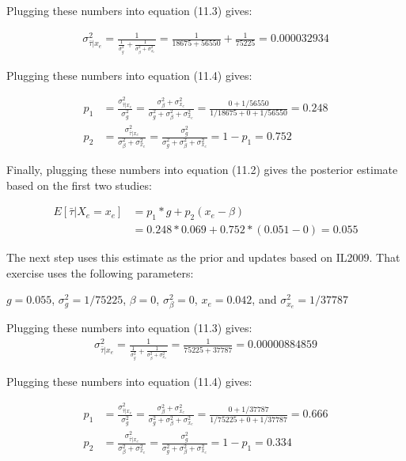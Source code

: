\documentclass[11pt,notitlepage]{article}\usepackage[]{graphicx}\usepackage[]{color}
\begin{document}
\begin{enumerate}[a)]
Plugging these numbers into equation (11.3) gives: 

 \begin{align*}
\sigma^2_{\bar{\tau}|x_e} = \frac{1}{\frac{1}{\sigma^2_g} + \frac{1}{\sigma^2_{\beta} + \sigma^2_{x_e}}} = \frac{1}{18675+56550 }+ \frac{1}{75225} = 0.000032934
\end{align*}
 
Plugging these numbers into equation (11.4) gives: 

\begin{align*}
p_1 &= \frac{\sigma^2_{\bar{\tau}|x_e}}{\sigma^2_g} = \frac{\sigma^2_{\beta} + \sigma^2_{x_e}}{\sigma^2_g +\sigma^2_{\beta} + \sigma^2_{x_e}} = \frac{0+1/56550}{1/18675+0+1/56550} = 0.248\\
p_2 &= \frac{\sigma^2_{\bar{\tau}|x_e}}{\sigma^2_{\beta} + \sigma^2_{x_e}} = \frac{\sigma^2_g}{\sigma^2_g +\sigma^2_{\beta} + \sigma^2_{x_e}} = 1 - p_1 = 0.752
\end{align*}

Finally, plugging these numbers into equation (11.2) gives the posterior estimate based on the first two studies:

\begin{align*}
E[\bar{\tau}|X_e = x_e] &= p_1*g + p_2(x_e - \beta) \\
&= 0.248 * 0.069 +0.752 * (0.051-0) = 0.055
\end{align*}


The next step uses this estimate as the prior and updates based on IL2009.  That exercise uses the following parameters: 

$g=0.055$, $\sigma^2_g = 1/75225$, $\beta = 0$, $\sigma^2_{\beta} = 0$, $x_e = 0.042$, and $\sigma^2_{x_e} = 1/37787$

Plugging these numbers into equation (11.3) gives: 
 \begin{align*}
\sigma^2_{\bar{\tau}|x_e} = \frac{1}{\frac{1}{\sigma^2_g} + \frac{1}{\sigma^2_{\beta} + \sigma^2_{x_e}}} = \frac{1}{75225+37787 }= 0.00000884859
\end{align*}

Plugging these numbers into equation (11.4) gives: 
 
 \begin{align*}
p_1 &= \frac{\sigma^2_{\bar{\tau}|x_e}}{\sigma^2_g} = \frac{\sigma^2_{\beta} + \sigma^2_{x_e}}{\sigma^2_g +\sigma^2_{\beta} + \sigma^2_{x_e}} = \frac{0+1/37787}{1/75225+0+1/37787} = 0.666\\
p_2 &= \frac{\sigma^2_{\bar{\tau}|x_e}}{\sigma^2_{\beta} + \sigma^2_{x_e}} = \frac{\sigma^2_g}{\sigma^2_g +\sigma^2_{\beta} + \sigma^2_{x_e}} = 1 - p_1 = 0.334
\end{align*}
 

\end{enumerate}
\end{document}
